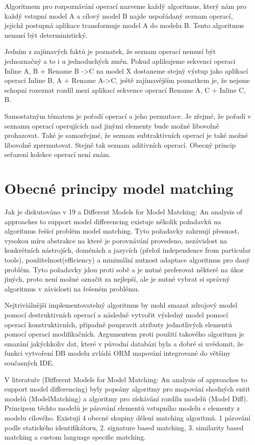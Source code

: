 \documentclass[11pt,twoside,a4paper]{book}
\begin{document}
Algoritmem pro rozpoznávání operací nazveme každý algoritmus, který nám pro
každý vstupní model A a cílový model B najde uspořádaný seznam operací, jejichž
postupná aplikace transformuje model A do modelu B. Tento algoritmus nemusí být
deterministický.

Jedním z zajímavých faktů je poznatek, že seznam operací nemusí být jednoznačný
a to i u jednoduchých změn. Pokud aplikujeme sekvenci operaci Inline A, B + 
Rename B ->C na model X dostaneme stejný výstup jako aplikací operací Inline B,
A + Rename A->C, ještě zajímavějším poznatkem je, že nejsme schopni rozeznat
rozdíl mezi aplikací sekvence operací Rename A, C + Inline C, B.

Samostatným tématem je pořadí operací a jeho permutace. Je zřejmé, že pořadí v
seznamu operací operujících nad jinými elementy bude možné libovolně prohazovat.
Také je samozřejmé, že seznam subtraktivních operací je také možné libovolně
zpermutovat. Stejně tak seznam aditivních operací. Obecný princip seřazení kolekce 
operací není znám.

\section{Obecné principy model matching}
Jak je diskutováno v 19 a Different Models for Model Matching:
An analysis of approaches to support model differencing existuje několik
požadavků na algoritmus řešící problém model matching. Tyto požadavky zahrnují
přesnost, vysokou míru abstrakce na které je porovnávání provedeno, nezávislost
na konkrétních nástrojích, doménách a jazycích (přelož independence from
particular tools), použitelnost(efficiency) a minimální nutnost adaptace
algoritmus pro daný problém. Tyto požadavky jdou proti sobě a je nutné
preferovat některé na úkor jiných, proto není možné označit za nejlepší, ale je
nutné vybrat si správný algoritmus v závislosti na řešeném problému.

Nejtriviálnější implementovatelný algoritmus by mohl smazat zdrojový model
pomocí destruktivních operací a následně vytvořit výsledný model pomocí operací
konstruktivních, připadně poupravit atributy jednotlivých elementů pomocí
operací modifikačních. Argumentem proti použití takového algoritmu je smazání jakýchkoliv dat, které v
původní databázi byla a dobré si uvědomit, že funkci vytvoření DB modelu zvládá
ORM mapování integrované do většiny současných IDE.

 V literatuře (Different Models for Model Matching:
An analysis of approaches to support model differencing) byly popsány algoritmy
pro mapování shodných entit modelů (ModelMatching) a algoritmy pro získávání rozdílu modelů (Model Diff).
 Principem těchto modelů je párování elementů vstupního modelu s elementy z
 modelu cílového. Existují 4 obecné skupiny dělení matching algoritmů. 1
 párování podle statického identifikátoru, 2. signature based matching, 3.
 similarity based matching a custom language specific matching.
 
\end{document}
